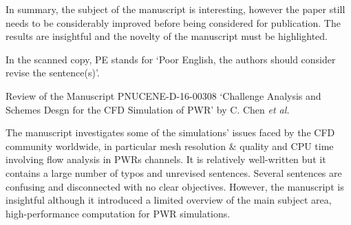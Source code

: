 \documentclass[14pt,twoside]{report}
\begin{document}
In summary, the subject of the manuscript is interesting, however the paper still needs to be considerably improved before being considered for publication. The results are insightful and the novelty of the manuscript must be highlighted. 

\medskip
In the scanned copy, PE stands for `Poor English, the authors should consider revise the sentence(s)'.
{
  } 


\clearpage


\begin{center}
  {\Large Review of the Manuscript PNUCENE-D-16-00308 `Challenge Analysis and Schemes Desgn for the CFD Simulation of PWR' by C. Chen {\it et al.}}
\end{center}

\medskip

The manuscript investigates some of the simulations' issues faced by the CFD community worldwide, in particular mesh resolution $\&$ quality and CPU time involving flow analysis in PWRs channels. It is relatively well-written but it contains a large number of typos and unrevised sentences. Several sentences are confusing and disconnected with no clear objectives.  However, the manuscript is insightful although it introduced a limited overview of the main subject area, high-performance computation for PWR simulations. 
\end{document}
